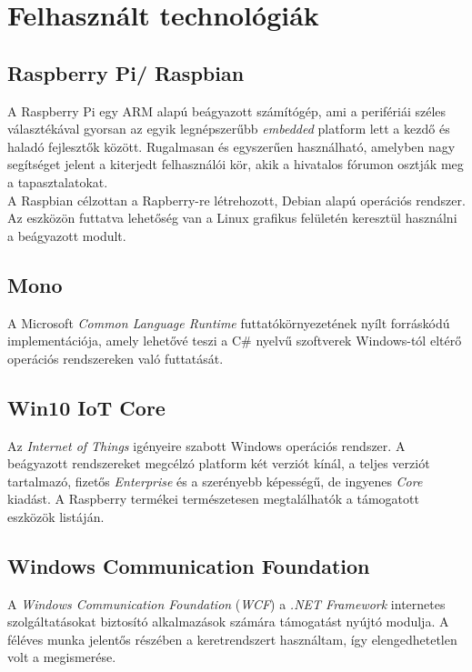 \chapter{Felhasznált technológiák}
\section{Raspberry Pi/ Raspbian}

A Raspberry Pi egy ARM alapú beágyazott számítógép, ami a perifériái széles választékával gyorsan az egyik legnépszerűbb \textit{embedded} platform lett a kezdő és haladó fejlesztők között. Rugalmasan és egyszerűen használható, amelyben nagy segítséget jelent a kiterjedt felhasználói kör, akik a hivatalos fórumon osztják meg a tapasztalatokat. \\
A Raspbian célzottan a Rapberry-re létrehozott, Debian alapú operációs rendszer. Az eszközön futtatva lehetőség van a Linux grafikus felületén keresztül használni a beágyazott modult.

\section{Mono}

A Microsoft \emph{Common Language Runtime} futtatókörnyezetének nyílt forráskódú implementációja, amely lehetővé teszi a C\# nyelvű szoftverek Windows-tól eltérő operációs rendszereken való futtatását.

\section{Win10 IoT Core}

Az \emph{Internet of Things} igényeire szabott Windows operációs rendszer. A beágyazott rendszereket megcélzó platform két verziót kínál, a teljes verziót tartalmazó, fizetős \emph{Enterprise} és a szerényebb képességű, de ingyenes \emph{Core} kiadást. A Raspberry termékei természetesen megtalálhatók a támogatott eszközök listáján.

\section{Windows Communication Foundation}
A \emph{Windows Communication Foundation} (\emph{WCF}) a \textit{.NET Framework} internetes szolgáltatásokat biztosító alkalmazások számára támogatást nyújtó modulja. A féléves munka jelentős részében a keretrendszert használtam, így elengedhetetlen volt a megismerése.

